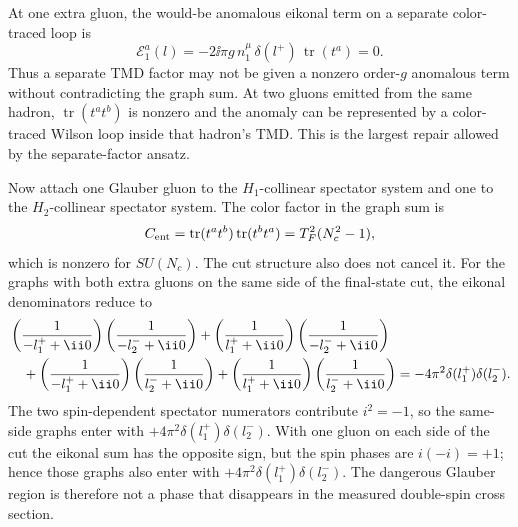\begin{controlledapproximation}
At one extra gluon, the would-be anomalous eikonal term on a separate
color-traced loop is
\begin{equation}
  \mathcal E_1^a(l)
  =
  -2\ii\pi g\,n_1^\mu\,\delta(l^+)\,
  \operatorname{tr}(t^a)
  =
  0 .
  \label{eq:scet-spectator-single-gluon-trace-zero}
\end{equation}
Thus a separate TMD factor may not be given a nonzero order-\(g\) anomalous
term without contradicting the graph sum.  At two gluons emitted from the
same hadron, \(\operatorname{tr}(t^at^b)\) is nonzero and the anomaly can be
represented by a color-traced Wilson loop inside that hadron's TMD.  This is
the largest repair allowed by the separate-factor ansatz.

Now attach one Glauber gluon to the \(H_1\)-collinear spectator system and
one to the \(H_2\)-collinear spectator system.  The color factor in the graph
sum is
\begin{equation}
  C_{\rm ent}
  =
  \operatorname{tr}(t^at^b)\operatorname{tr}(t^bt^a)
  =
  T_F^2(N_c^2-1),
  \label{eq:scet-spectator-color-entanglement-factor}
\end{equation}
which is nonzero for \(SU(N_c)\).  The cut structure also does not cancel it.
For the graphs with both extra gluons on the same side of the final-state
cut, the eikonal denominators reduce to
\begin{align}
  &\left( \frac{1}{-l_1^+ + \ii0} \right)
   \left( \frac{1}{-l_2^- + \ii0} \right)
  +\left( \frac{1}{ l_1^+ + \ii0} \right)
   \left( \frac{1}{-l_2^- + \ii0} \right)
  \notag\\
  &\quad
  +\left( \frac{1}{-l_1^+ + \ii0} \right)
   \left( \frac{1}{ l_2^- + \ii0} \right)
  +\left( \frac{1}{ l_1^+ + \ii0} \right)
   \left( \frac{1}{ l_2^- + \ii0} \right)
  =
  -4\pi^2\delta(l_1^+)\delta(l_2^-).
  \label{eq:scet-spectator-same-cut-eikonal-sum}
\end{align}
The two spin-dependent spectator numerators contribute \(i^2=-1\), so the
same-side graphs enter with
\(+4\pi^2\delta(l_1^+)\delta(l_2^-)\).  With one gluon on each side of the
cut the eikonal sum has the opposite sign, but the spin phases are
\(i(-i)=+1\); hence those graphs also enter with
\(+4\pi^2\delta(l_1^+)\delta(l_2^-)\).  The dangerous Glauber region is
therefore not a phase that disappears in the measured double-spin cross
section.


\end{controlledapproximation}
